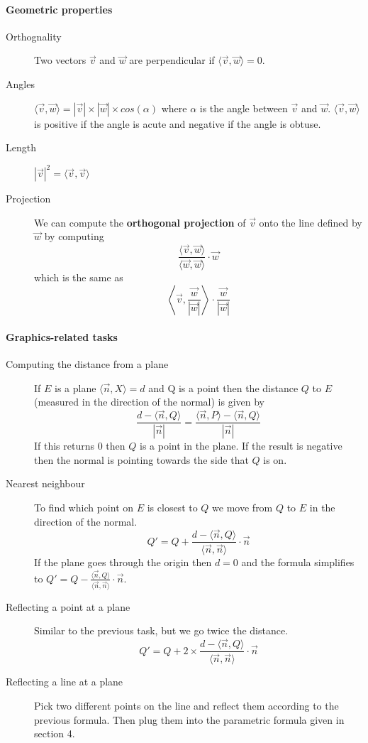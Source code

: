 \documentclass{article}
\begin{document}
\paragraph{Geometric properties}
\begin{description}
\item [Orthognality] Two vectors $\vec{v}$ and $\vec{w}$ are perpendicular if $\langle\vec{v},\vec{w}\rangle=0$.
\item[Angles] $\langle\vec{v},\vec{w}\rangle=|\vec{v}|\times|\vec{w}|\times cos(\alpha)$ where $\alpha$ is the angle between $\vec{v}$ and $\vec{w}$. $\langle\vec{v},\vec{w}\rangle$ is positive if the angle is acute and negative if the angle is obtuse.
\item [Length] $|\vec{v}|^2=\langle\vec{v},\vec{v}\rangle$
\item [Projection] We can compute the \textbf{orthogonal projection} of $\vec{v}$ onto the line defined by $\vec{w}$ by computing
$$\frac{\langle\vec{v},\vec{w}\rangle}{\langle\vec{w},\vec{w}\rangle}\cdot\vec{w}$$
which is the same as
$$\left\langle\vec{v},\frac{\vec{w}}{|\vec{w}|}\right\rangle\cdot\frac{\vec{w}}{|\vec{w}|}$$
\end{description}

\paragraph{Graphics-related tasks}
\begin{description}
\item [Computing the distance from a plane] If $E$ is a plane $\langle\vec{n},X\rangle =d$ and Q is a point then the distance $Q$ to $E$ (measured in the direction of the normal) is given by
$$\frac{d-\langle\vec{n},Q\rangle}{|\vec{n}|}=\frac{\langle\vec{n},P\rangle -\langle\vec{n},Q\rangle}{|\vec{n}|}$$
If this returns 0 then $Q$ is a point in the plane. If the result is negative then the normal is pointing towards the side that $Q$ is on.
\item [Nearest neighbour] To find which point on $E$ is closest to $Q$ we move from $Q$ to $E$ in the direction of the normal.
$$Q'=Q+\frac{d-\langle\vec{n},Q\rangle}{\langle\vec{n},\vec{n}\rangle}\cdot\vec{n}$$
If the plane goes through the origin then $d=0$ and the formula simplifies to
$Q'=Q-\frac{\langle\vec{n},Q\rangle}{\langle\vec{n},\vec{n}\rangle}\cdot\vec{n}$.
\item [Reflecting a point at a plane] Similar to the previous task, but we go twice the distance.
$$Q'=Q+2\times\frac{d-\langle\vec{n},Q\rangle}{\langle\vec{n},\vec{n}\rangle}\cdot\vec{n}$$
\item [Reflecting a line at a plane] Pick two different points on the line and reflect them according to the previous formula. Then plug them into the parametric formula given in section 4.
\end{description}
\end{document}
